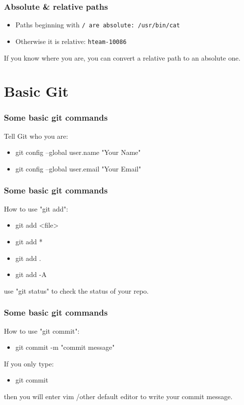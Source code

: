 \documentclass[aspectratio=169]{beamer}
\begin{document}
\begin{frame}
  \frametitle{Absolute \& relative paths}
  \begin{itemize}
    \item Paths beginning with \tt{/} are absolute: \tt{/usr/bin/cat}
    \item Otherwise it is relative: \tt{hteam-10086}
  \end{itemize}

  If you know where you are, you can convert a relative path to an absolute one.
\end{frame}

\section{Basic Git}
\begin{frame}
  \frametitle{Some basic git commands}
  Tell Git who you are:
  \begin{itemize}
    \item git config --global user.name "Your Name"
    \item git config --global user.email "Your Email"
  \end{itemize}
\end{frame}

\begin{frame}
  \frametitle{Some basic git commands}
  How to use "git add":
  \begin{itemize}
    \item git add <file>
    \item git add *
    \item git add .
    \item git add -A
  \end{itemize}
  use "git status" to check the status of your repo.

\end{frame}

\begin{frame}
  \frametitle{Some basic git commands}
  How to use "git commit":
  \begin{itemize}
    \item git commit -m "commit message"
  \end{itemize}
  If you only type: 
  \begin{itemize}
    \item git commit
  \end{itemize}
  then you will enter vim /other default editor to write your commit message.
\end{frame}
\end{document}
